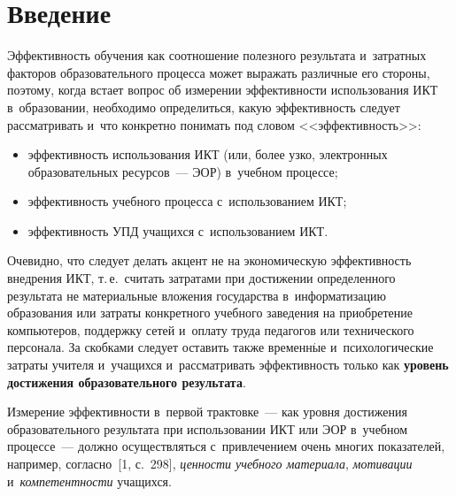 \begin{multicols}{2}

\label{st\stat}



\section{Введение }

     Эффективность обучения как соотношение полезного результата и~затратных
факторов образовательного процесса может выражать различные его стороны, поэтому, когда
встает вопрос об измерении эффективности использования
ИКТ в~образовании, необходимо определиться, какую эффективность следует
рассматривать и~что конкретно понимать под словом <<эффективность>>:
     \begin{itemize}
\item эффективность использования ИКТ (или, более узко, электронных образовательных
ресурсов~--- ЭОР) в~учебном процессе;
\item эффективность учебного процесса с~использованием ИКТ;
\item эффективность УПД учащихся с~использованием ИКТ.
\end{itemize}

   Очевидно, что следует делать акцент не на экономическую эффективность внедрения ИКТ,
т.\,е.\ считать затратами при достижении определенного результата не материальные
вложения государства в~информатизацию образования или затраты конкретного учебного
заведения на приобретение компьютеров, поддержку сетей и~оплату труда педагогов или
технического персонала. За скобками следует оставить также
временн$\acute{\mbox{ы}}$е и~психологические затраты учителя и~учащихся и~рассматривать
эффективность только как \textbf{уровень достижения образовательного результата}.

   Измерение эффективности в~первой трактовке~--- как уровня достижения
   образовательного\linebreak
результа\-та при использовании ИКТ или ЭОР в~учебном процессе~--- должно осуществляться с~привлечением очень многих показателей, например, согласно~[1, с.~298], \textit{ценности
учебного материала}, \textit{мотивации} и~\textit{компетентности} учащихся.


\end{multicols}
